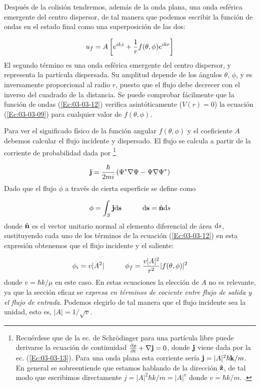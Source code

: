 Después de la colisión tendremos, además de la onda plana, una onda esférica emergente del centro dispersor, de tal manera que podemos escribir la función de ondas en el estado final como una superposición de las dos:

\begin{equation} 
	u_f = A \left[ e^{ikz}+\frac{1}{r} f(\theta,\phi)e^{ikr} \right] \label{Ec:03-03-12}
\end{equation}
El segundo término es una onda esférica emergente del centro dispersor, y representa la partícula dispersada. Su amplitud depende de los ángulos $\theta$, $\phi$, y es inversamente proporcional al radio $r$, puesto que el flujo debe decrecer con el inverso del cuadrado de la distancia. Se puede comprobar fácilmente que la función de ondas (\ref{Ec:03-03-12}) verifica asintóticamente ($V(r)=0$) la ecuación (\ref{Ec:03-03-09}) para cualquier valor de $f(\theta,\phi)$. 

Para ver el significado físico de la función angular $f(\theta,\phi)$ y el coeficiente $A$ debemos calcular el flujo incidente y dispersado. El flujo se calcula a partir de la corriente de probabilidad dada por \footnote{Recuérdese que de la ec. de Schrödinger para una partícula libre puede derivarse la ecuación de continuidad $\frac{\partial \rho}{\partial t}+\nabla \mathbf{j}=0$, donde $\mathbf{j}$ viene dada por la ec. (\ref{Ec:03-03-13}). Para una onda plana esta corriente sería $\mathbf{j} = |A|^2 \hbar \mathbf{k} /m$. En general se sobreentiende que estamos hablando de la dirección $\hat{\mathbf{z}}$, de tal modo que escribimos directamente $j=|A|^2\hbar k/m=|A|^v$ donde $v=\hbar k /m$. .}

\begin{equation}
	\mathbf{j} = \frac{\hbar}{2mi} \left( \Psi^* \nabla \Psi - \Psi \nabla \Psi ^* \right) \label{Ec:03-03-13}
\end{equation}
Dado que el flujo $\phi$ a través de cierta superficie se define como 

\begin{equation}
	\phi = \int_S \mathbf{j} \mathrm{d} \mathbf{s} \quad \quad \quad \mathrm{d} \mathbf{s} = \hat{\mathbf{n}} \mathrm{d} s
\end{equation}
donde $\hat{\mathbf{n}}$ es el vector unitario normal al elemento diferencial de área $\mathrm{d} s$, sustituyendo cada uno de los términos de la ecuación (\ref{Ec:03-03-12}) en esta expresión obtenemos que el flujo incidente y el saliente:

\begin{equation}
	\phi_i = v|A^2| \quad \quad \quad \phi_f = \frac{v|A|^2}{r^2} |f(\theta,\phi)|^2
\end{equation}
donde $v=\hbar k /\mu$ en este caso.  En estas ecuaciones la elección de $A$ no es relevante, ya que la sección eficaz se \textit{expresa en términos de cociente entre flujo de salida y el flujo de entrada}. Podemos elegirlo de tal manera que el flujo incidente sea la unidad, esto es, $|A|=1/\sqrt{v}$.
 
